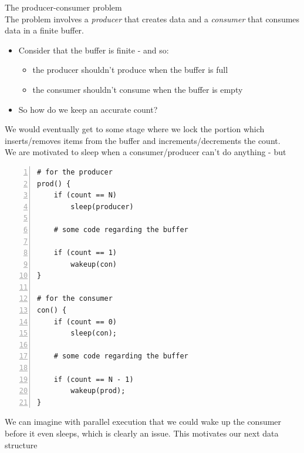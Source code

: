 \documentclass[journal, letterpaper]{IEEEtran}
\begin{document}
\begin{example}{The producer-consumer problem} \\
    The problem involves a \textit{producer} that creates data 
    and a \textit{consumer} that consumes data in a finite buffer.
    \begin{itemize}
        \item Consider that the buffer is finite - and so:
        \begin{itemize}
            \item the producer shouldn't produce when the buffer is full
            \item the consumer shouldn't consume when the buffer is empty
        \end{itemize}
        \item So how do we keep an accurate count?
    \end{itemize}
    We would eventually get to some stage where we lock the portion which inserts/removes items from the buffer and increments/decrements the count.
    \newline \\ 
    We are motivated to sleep when a consumer/producer can't do anything - but
    \begin{Verbatim}[numbers=left, numbersep=2mm, frame=single]
# for the producer
prod() {
    if (count == N)
        sleep(producer)

    # some code regarding the buffer

    if (count == 1)
        wakeup(con)
}

# for the consumer
con() {
    if (count == 0)
        sleep(con);

    # some code regarding the buffer

    if (count == N - 1)
        wakeup(prod);
}
    \end{Verbatim}
    We can imagine with parallel execution that we could wake up the consumer before it even sleeps, which is clearly an issue. This motivates our next data structure
\end{example}
\end{document}
